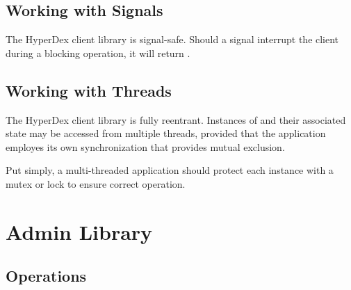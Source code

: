 
\pagebreak

\subsection{Working with Signals}
\label{sec:api:c:client:signals}

The HyperDex client library is signal-safe.  Should a signal interrupt the
client during a blocking operation, it will return
.

\subsection{Working with Threads}
\label{sec:api:c:client:threads}

The HyperDex client library is fully reentrant.  Instances of  and their associated state may be accessed from multiple
threads, provided that the application employes its own synchronization that
provides mutual exclusion.

Put simply, a multi-threaded application should protect each  instance with a mutex or lock to ensure correct operation.

\section{Admin Library}
\label{sec:api:c:admin}

\subsection{Operations}
\label{sec:api:c:admin:ops}


